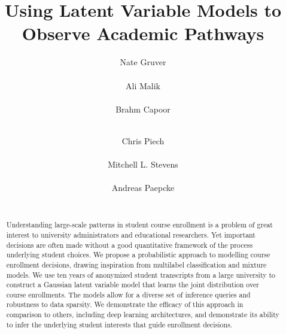 \documentclass{edm_template}
\begin{document}

\title{Using Latent Variable Models to Observe Academic Pathways}

\author{
\alignauthor Nate Gruver \\
      \\
\alignauthor Ali Malik \\
      \\
\alignauthor Brahm Capoor \\
      \\
\and
\alignauthor Chris Piech\\
      \\
\alignauthor Mitchell L. Stevens\\
      \\
\alignauthor Andreas Paepcke \\
      \\
}


\maketitle
\begin{abstract}

Understanding large-scale patterns in student course enrollment is a problem of great interest to university administrators and educational researchers. Yet important decisions are often made without a good quantitative framework of the process underlying student choices. We propose a probabilistic approach to modelling course enrollment decisions, drawing inspiration from multilabel classification and mixture models. We use ten years of anonymized student transcripts from a large university to construct a Gaussian latent variable model that learns the joint distribution over course enrollments. The models allow for a diverse set of inference queries and robustness to data sparsity. We demonstrate the efficacy of this approach in comparison to others, including deep learning architectures, and demonstrate its ability to infer the underlying student interests that guide enrollment decisions. 
\end{abstract}
\end{document}
